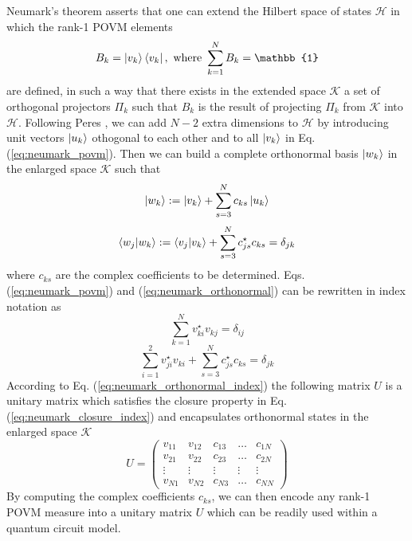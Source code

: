 Neumark's theorem \cite{neumark1940} asserts that one can extend the Hilbert space of states $\mathcal{H}$ in which the rank-1 POVM elements 
\begin{equation}\label{eq:neumark_povm}
B_k = \ket{v_{k}} \bra{v_{k}},\ \text{where}\ \sum_{k=1}^{N} B_{k} = \mathbb{1}
\end{equation}
 are defined, in such a way that there exists in the extended space $\mathcal{K}$ a set of orthogonal projectors $\Pi_{k}$ such that $B_k$
 is the result of projecting $\Pi_{k}$ from $\mathcal{K}$ into $\mathcal{H}$. Following Peres \cite{peres1995}, we can add $N-2$ extra dimensions to $\mathcal{H}$ by introducing unit vectors $\ket{u_{k}}$ othogonal to each other and to all $\ket{v_{k}}$ in Eq. (\ref{eq:neumark_povm}). Then we can build a complete orthonormal basis $\ket{w_{k}}$ in the enlarged space $\mathcal{K}$ such that
\begin{equation}
\ket{w_{k}} := \ket{v_{k}} + \sum_{s=3}^{N} c_{k s} \ket{u_{k}}
\end{equation}
\begin{equation}\label{eq:neumark_orthonormal}
\bra{w_{j}} \ket{w_{k}} := \bra{v_{j}} \ket{v_{k}} + \sum_{s=3}^{N} c_{j s}^{\star} c_{k s} = \delta_{j k}
\end{equation}
where $c_{ks}$ are the complex coefficients to be determined. Eqs. (\ref{eq:neumark_povm}) and (\ref{eq:neumark_orthonormal}) can be rewritten in index notation as 
\begin{equation}\label{eq:neumark_closure_index}
\sum_{k=1}^{N}v_{k i}^{\star} v_{k j} = \delta_{ij}
\end{equation}
\begin{equation}\label{eq:neumark_orthonormal_index}
\sum_{i=1}^{2} v_{j i}^{\star} v_{k i} + \sum_{s=3}^{N} c_{j s}^{\star} c_{k s} = \delta_{j k}
\end{equation}
According to Eq. (\ref{eq:neumark_orthonormal_index}) the following matrix $U$ is a unitary matrix which satisfies the closure property in Eq. (\ref{eq:neumark_closure_index}) and encapsulates orthonormal states in the enlarged space $\mathcal{K}$ 
\begin{equation}
U = 
\begin{pmatrix}
v_{1 1} & v_{1 2} & c_{13} & \dots & c_{1 N} \\
v_{2 1} & v_{2 2} & c_{23} & \dots & c_{2 N} \\
\vdots & \vdots & \vdots & \vdots &  \vdots \\
v_{N1} & v_{N2} & c_{N3} & \dots & c_{NN}
\end{pmatrix}
\end{equation}
By computing the complex coefficients $c_{ks}$, we can then encode any rank-1 POVM measure into a unitary matrix $U$ which can be readily used within a quantum circuit model.